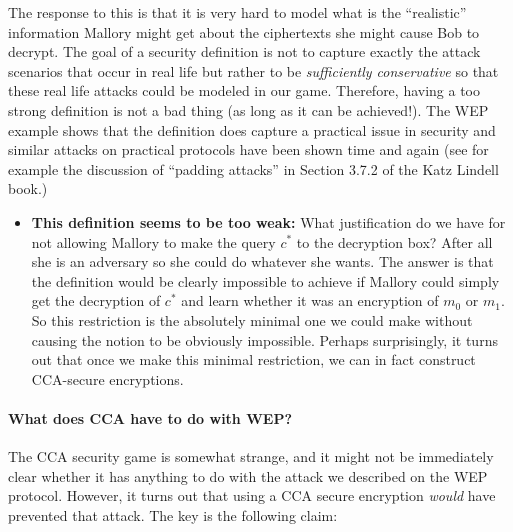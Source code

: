 The response to this is that it is very hard to model what is the
``realistic'' information Mallory might get about the ciphertexts she
might cause Bob to decrypt. The goal of a security definition is not to
capture exactly the attack scenarios that occur in real life but rather
to be \emph{sufficiently conservative} so that these real life attacks
could be modeled in our game. Therefore, having a too strong definition
is not a bad thing (as long as it can be achieved!). The WEP example
shows that the definition does capture a practical issue in security and
similar attacks on practical protocols have been shown time and again
(see for example the discussion of ``padding attacks'' in Section 3.7.2
of the Katz Lindell book.)

\begin{itemize}
\tightlist
\item
  \textbf{This definition seems to be too weak:} What justification do
  we have for not allowing Mallory to make the query \(c^*\) to the
  decryption box? After all she is an adversary so she could do whatever
  she wants. The answer is that the definition would be clearly
  impossible to achieve if Mallory could simply get the decryption of
  \(c^*\) and learn whether it was an encryption of \(m_0\) or \(m_1\).
  So this restriction is the absolutely minimal one we could make
  without causing the notion to be obviously impossible. Perhaps
  surprisingly, it turns out that once we make this minimal restriction,
  we can in fact construct CCA-secure encryptions.
\end{itemize}

\paragraph{What does CCA have to do with WEP?} The CCA security game is
somewhat strange, and it might not be immediately clear whether it has
anything to do with the attack we described on the WEP protocol.
However, it turns out that using a CCA secure encryption \emph{would}
have prevented that attack. The key is the following claim:

\hypertarget{ccaweplem}{}

